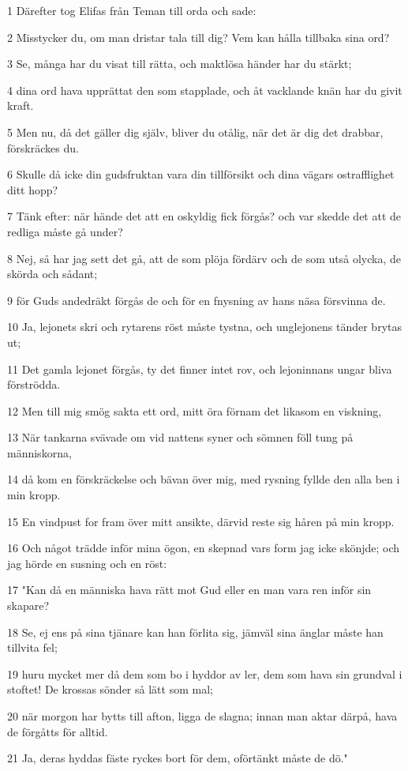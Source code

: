 \par 1 Därefter tog Elifas från Teman till orda och sade:
\par 2 Misstycker du, om man dristar tala till dig? Vem kan hålla tillbaka sina ord?
\par 3 Se, många har du visat till rätta, och maktlösa händer har du stärkt;
\par 4 dina ord hava upprättat den som stapplade, och åt vacklande knän har du givit kraft.
\par 5 Men nu, då det gäller dig själv, bliver du otålig, när det är dig det drabbar, förskräckes du.
\par 6 Skulle då icke din gudsfruktan vara din tillförsikt och dina vägars ostrafflighet ditt hopp?
\par 7 Tänk efter: när hände det att en oskyldig fick förgås? och var skedde det att de redliga måste gå under?
\par 8 Nej, så har jag sett det gå, att de som plöja fördärv och de som utså olycka, de skörda och sådant;
\par 9 för Guds andedräkt förgås de och för en fnysning av hans näsa försvinna de.
\par 10 Ja, lejonets skri och rytarens röst måste tystna, och unglejonens tänder brytas ut;
\par 11 Det gamla lejonet förgås, ty det finner intet rov, och lejoninnans ungar bliva förströdda.
\par 12 Men till mig smög sakta ett ord, mitt öra förnam det likasom en viskning,
\par 13 När tankarna svävade om vid nattens syner och sömnen föll tung på människorna,
\par 14 då kom en förskräckelse och bävan över mig, med rysning fyllde den alla ben i min kropp.
\par 15 En vindpust for fram över mitt ansikte, därvid reste sig håren på min kropp.
\par 16 Och något trädde inför mina ögon, en skepnad vars form jag icke skönjde; och jag hörde en susning och en röst:
\par 17 "Kan då en människa hava rätt mot Gud eller en man vara ren inför sin skapare?
\par 18 Se, ej ens på sina tjänare kan han förlita sig, jämväl sina änglar måste han tillvita fel;
\par 19 huru mycket mer då dem som bo i hyddor av ler, dem som hava sin grundval i stoftet! De krossas sönder så lätt som mal;
\par 20 när morgon har bytts till afton, ligga de slagna; innan man aktar därpå, hava de förgåtts för alltid.
\par 21 Ja, deras hyddas fäste ryckes bort för dem, oförtänkt måste de dö."

